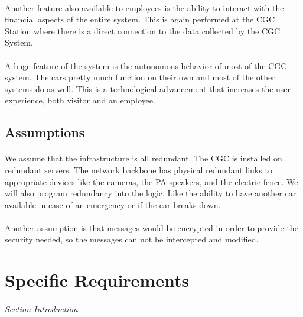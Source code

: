 \documentclass[12pt]{article}
\begin{document}
        \paragraph{} Another feature also available to employees is the ability to interact with the financial aspects of the entire system. This is again performed at the CGC Station where there is a direct connection to the data collected by the CGC System.
		
        \paragraph{} A huge feature of the system is the autonomous behavior of most of the CGC system. The cars pretty much function on their own and most of the other systems do as well.
        This is a technological advancement that increases the user experience, both visitor and an employee.
	


	\subsection{Assumptions}
	\paragraph{} We assume that the infrastructure is all redundant. The CGC is 
	installed on redundant servers. The network backbone has physical redundant 
	links to appropriate devices like the cameras, the PA speakers, and the 
	electric fence. We will also	program redundancy into the logic. Like the 
	ability to have another car available in case of an emergency or if the car 
	breaks down.
		
	\paragraph{} Another assumption is that messages would be encrypted in order 
	to provide the security needed, so the messages can not be intercepted and 
	modified.

\section{Specific Requirements} \label{spec} %
\paragraph{} \textit{Section Introduction}
\end{document}
